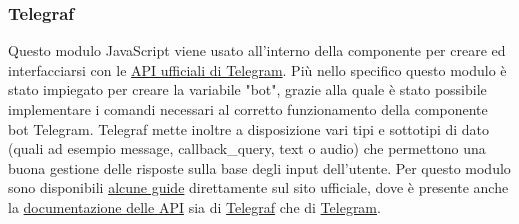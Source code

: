 		\subsubsection{Telegraf}
			Questo modulo JavaScript viene usato all'interno della componente  per creare ed interfacciarsi con le \href{https://core.telegram.org/bots/api}{API ufficiali di Telegram}.
			Più nello specifico questo modulo è stato impiegato per creare la variabile "bot", grazie alla quale è stato possibile implementare i comandi necessari al corretto funzionamento della componente bot Telegram.
			Telegraf mette inoltre a disposizione vari tipi e sottotipi di dato (quali ad esempio message, callback\_query, text o audio) che permettono una buona gestione delle risposte sulla base degli input dell'utente. Per questo modulo sono disponibili \href{https://telegraf.js.org/#/?id=getting-started}{alcune guide} direttamente sul sito ufficiale, dove è presente anche la \href{https://telegraf.js.org/#/?id=api-reference}{documentazione delle API} sia di \href{https://telegraf.js.org/#/?id=telegraf}{Telegraf} che di \href{https://telegraf.js.org/#/?id=telegram}{Telegram}.
	